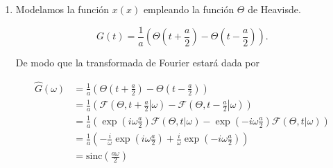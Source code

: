 \documentclass[a4paper,12pt,final]{article}
\begin{document}
      \begin{enumerate}[label=\alph*)]
        \item Modelamos la función $x\left(x\right)$ empleando la función
          $\Theta$ de Heavisde.

          \begin{equation*}
            G\left(t\right) = \frac{1}{a}\left(
                                \Theta\left(t + \frac{a}{2}\right) -
                                \Theta\left(t - \frac{a}{2}\right)
                              \right).
          \end{equation*}

          \noindent De modo que la transformada de Fourier estará dada por

          \begin{equation*}
            \begin{split}
              \widehat{G}\left(\omega\right) & = \frac{1}{a}\left(
                                                   \Theta\left(t + \frac{a}{2}\right) -
                                                   \Theta\left(t - \frac{a}{2}\right)
                                                 \right) \\
                                             & = \frac{1}{a}\left(
                                                   \mathcal{F}\left(\Theta,\left.t + \frac{a}{2}\right|\omega\right) -
                                                   \mathcal{F}\left(\Theta,\left.t - \frac{a}{2}\right|\omega\right)
                                                 \right) \\
                                             & = \frac{1}{a}\left(
                                                   \exp\left( i\omega\frac{a}{2}\right)\mathcal{F}\left(\Theta,t|\omega\right) -
                                                   \exp\left(-i\omega\frac{a}{2}\right)\mathcal{F}\left(\Theta,t|\omega\right)
                                                 \right) \\
                                             & = \frac{1}{a}\left(
                                                   -\frac{i}{\omega}\exp\left( i\omega\frac{a}{2}\right)
                                                   +\frac{i}{\omega}\exp\left(-i\omega\frac{a}{2}\right)
                                                 \right) \\
                                             & = \mathrm{sinc}\left(\frac{a\omega}{2}\right)
            \end{split}
          \end{equation*}


\end{enumerate}
\end{document}
